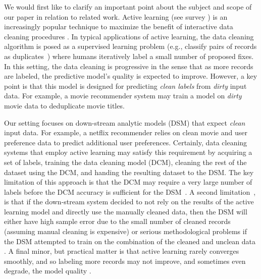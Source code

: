We would first like to clarify an important point about the subject and scope of our paper in relation to related work.
Active learning (see survey \cite{settles2010active}) is an increasingly popular technique to maximize the benefit of interactive data cleaning procedures \cite{DBLP:journals/pvldb/YakoutENOI11, gokhale2014corleone, yakout2013don, DBLP:journals/pvldb/HaasKWF015}.
In typical applications of active learning, the data cleaning algorithm is posed as a supervised learning problem (e.g., classify pairs of records as duplicates~\cite{gokhale2014corleone}) where humans iteratively label a small number of proposed fixes.
In this setting, the data cleaning is progressive in the sense that as more records are labeled, the predictive model's quality is expected to improve.
However, a key point is that this model is designed for predicting {\it clean labels} from {\it dirty} input data.  
For example, a movie recommender system may train a model on {\it dirty} movie data to deduplicate movie titles.

Our \sys setting focuses on down-stream analytic models (DSM) that expect {\it clean} input data.  
For example, a netflix recommender relies on clean movie and user preference data to predict additional user preferences.   
Certainly, data cleaning systems that employ active learning may satisfy this requirement by acquiring a set of labels, training the data cleaning model (DCM), cleaning the rest of the dataset using the DCM,
and handing the resulting dataset to the DSM.
The key limitation of this approach is that the DCM may require a very large number of labels before the DCM accuracy is sufficient for the DSM~.
A second limitation~, is that if the down-stream system decided to not rely on the results of the active learning model and directly use the manually cleaned data, then
the DSM will either have high sample error due to the small number of cleaned records (assuming manual cleaning is expensive) or 
serious methodological problems if the DSM attempted to train on the combination of the cleaned and unclean data .
A final minor, but practical matter is that active learning rarely converges smoothly, and so labeling more records may not improve, and sometimes even degrade, the model quality .

